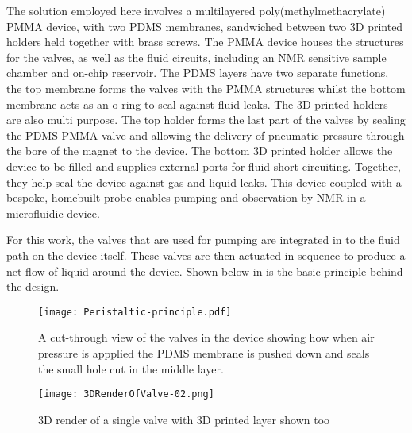 The solution employed here involves a multilayered poly(methylmethacrylate) PMMA device,
with two PDMS membranes, sandwiched between two 3D printed holders held together with brass
screws. The PMMA device houses the structures for the valves, as well as the fluid circuits,
including an NMR sensitive sample chamber and on-chip reservoir. The PDMS layers have two
separate functions, the top membrane forms the valves with the PMMA structures whilst the
bottom membrane acts as an o-ring to seal against fluid leaks. The 3D printed holders
are also multi purpose. The top holder forms the last part of the valves by sealing the
PDMS-PMMA valve and allowing the delivery of pneumatic pressure through the bore of the
magnet to the device. The bottom 3D printed holder allows the device to be filled and
supplies external ports for fluid short circuiting. Together, they help seal the device
against gas and liquid leaks. This device coupled with a bespoke, homebuilt probe enables
pumping and observation by NMR in a microfluidic device.

For this work, the valves that are used for pumping are integrated
in to the fluid path on the device itself. These valves are then actuated in sequence to produce a net flow
of liquid around the device. Shown below in  is the
basic principle behind the design.

\begin{figure}[ht]
  \begin{center}
  \texttt{[image: Peristaltic-principle.pdf]}
  \caption{A cut-through view of the valves in the device showing how when air pressure is
  appplied the PDMS membrane is pushed down and seals the small hole cut in the middle layer.}
  \label{fig:PP-device}
  \end{center}
\end{figure}

\begin{figure}[ht]
  \begin{center}
  \texttt{[image: 3DRenderOfValve-02.png]}
  \caption{3D render of a single valve with 3D printed layer shown too}
  \label{fig:ValveRend}
  \end{center}
\end{figure}

